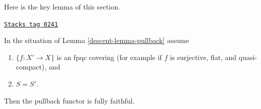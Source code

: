 Here is the key lemma of this section.

\begin{lemma}
\label{descent-lemma-fully-faithful}
\href{https://stacks.math.columbia.edu/tag/0241}{\texttt{Stacks tag 0241}}

In the situation of Lemma \ref{descent-lemma-pullback}
assume
\begin{enumerate}
\item $\{f : X' \to X\}$ is an fpqc covering (for example if $f$ is
surjective, flat, and quasi-compact), and
\item $S = S'$.
\end{enumerate}
Then the pullback functor is fully faithful.
\end{lemma}

